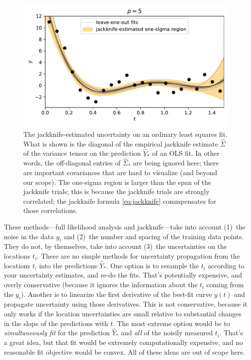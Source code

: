\documentclass[12pt,letterpaper]{article}
\newlength{\figurewidth}
\begin{document}
\begin{figure}[t]
    \begin{mdframed}
    \includegraphics[width=\figurewidth]{paper/uncertainty.pdf}
    \caption{The jackknife-estimated uncertainty on an ordinary least squares fit. What is shown is the diagonal of the empirical jackknife estimate $\hat{\Sigma}$ of the variance tensor on the prediction $\hat{Y}_\ast$ of an OLS fit. In other words, the off-diagonal entries of $\hat{\Sigma}_\ast$ are being ignored here; there are important covariances that are hard to visualize (and beyond our scope). The one-sigma region is larger than the span of the jackknife trials; this is because the jackknife trials are strongly correlated; the jackknife formula \eqref{eq:jackknife} commpensates for those correlations.}
    \label{fig:uncertainty}
    \end{mdframed}
\end{figure}

These methods---full likelihood analysis and jackknife---take into account (1)~the noise in the data $y_i$ and (2)~the number and spacing of the training data points.
They do not, by themselves, take into account (3)~the uncertainties on the locations $t_i$.
There are no simple methods for uncertainty propagation from the locations $t_i$ into the predictions $\hat{Y}_\ast$.
One option is to resample the $t_i$ according to your uncertainty estimates, and re-do the fits.
That's potentially expensive, and overly conservative (because it ignores the information about the $t_i$ coming from the $y_i$).
Another is to linearize the first derivative of the best-fit curve $y(t)$ and propagate uncertainty using those derivatives.
This is not conservative, because it only works if the location uncertainties are small relative to substantial changes in the slope of the predictions with $t$.
The most extreme option would be to \emph{simultaneously fit} for the prediction $\hat{Y}_\ast$ and \emph{all} of the noisily measured $t_i$.
That's a great idea, but that fit would be extremely computationally expensive, and no reasonable fit objective would be convex.
All of these ideas are out of scope here.
\end{document}
